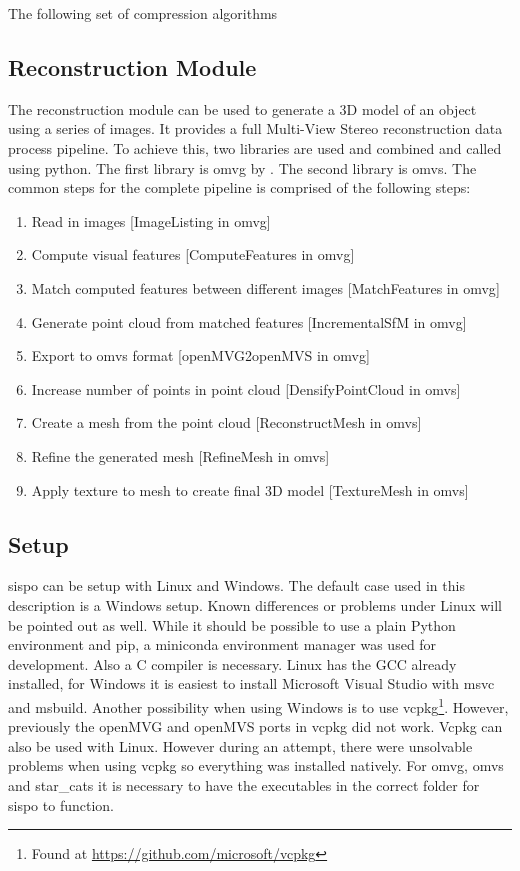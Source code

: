 The following set of compression algorithms 

\subsection{Reconstruction Module}
The reconstruction module can be used to generate a 3D model of an object using a series of images. It provides a full Multi-View Stereo reconstruction data process pipeline. To achieve this, two libraries are used and combined and called using python. The first library is \gls{omvg} by \cite{openMVG}. The second library is \gls{omvs}. 
The common steps for the complete pipeline is comprised of the following steps:
\begin{enumerate}
    \item Read in images [ImageListing in \gls{omvg}]
    \item Compute visual features [ComputeFeatures in \gls{omvg}]
    \item Match computed features between different images [MatchFeatures in \gls{omvg}]
    \item Generate point cloud from matched features [IncrementalSfM in \gls{omvg}]
    \item Export to \gls{omvs} format [openMVG2openMVS in \gls{omvg}]
    \item Increase number of points in point cloud [DensifyPointCloud in \gls{omvs}]
    \item Create a mesh from the point cloud [ReconstructMesh in \gls{omvs}]
    \item Refine the generated mesh [RefineMesh in \gls{omvs}]
    \item Apply texture to mesh to create final 3D model [TextureMesh in \gls{omvs}]
\end{enumerate}

\subsection{Setup}
\gls{sispo} can be setup with Linux and Windows. The default case used in this description is a Windows setup. Known differences or problems under Linux will be pointed out as well. While it should be possible to use a plain Python environment and pip, a miniconda environment manager was used for development. Also a C compiler is necessary. Linux has the GCC already installed, for Windows it is easiest to install Microsoft Visual Studio with \gls{msvc} and \gls{msbuild}. Another possibility when using Windows is to use vcpkg\footnote{Found at \url{https://github.com/microsoft/vcpkg}}. However, previously the openMVG and openMVS ports in vcpkg did not work. Vcpkg can also be used with Linux. However during an attempt, there were unsolvable problems when using vcpkg so everything was installed natively.
For \gls{omvg}, \gls{omvs} and star\_cats it is necessary to have the executables in the correct folder for \gls{sispo} to function. \newline

